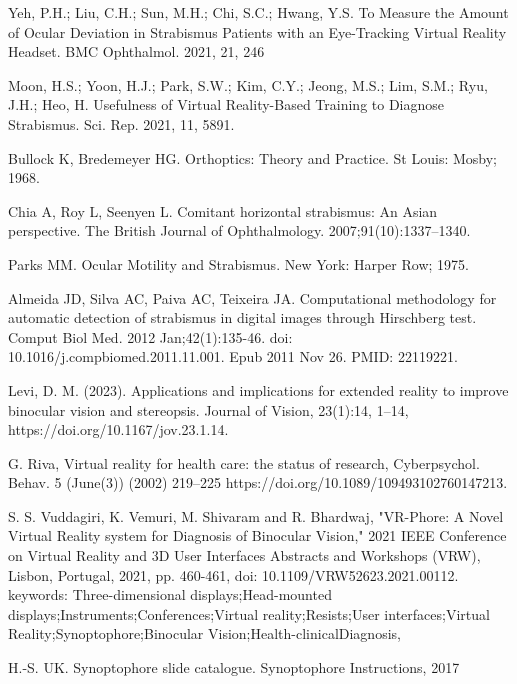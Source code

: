 \documentclass{article}
\begin{document}
\begin{thebibliography}{99}
Yeh, P.H.; Liu, C.H.; Sun, M.H.; Chi, S.C.; Hwang, Y.S. To Measure the Amount of Ocular Deviation in Strabismus Patients with
an Eye-Tracking Virtual Reality Headset. BMC Ophthalmol. 2021, 21, 246

Moon, H.S.; Yoon, H.J.; Park, S.W.; Kim, C.Y.; Jeong, M.S.; Lim, S.M.; Ryu, J.H.; Heo, H. Usefulness of Virtual Reality-Based
Training to Diagnose Strabismus. Sci. Rep. 2021, 11, 5891.


Bullock K, Bredemeyer HG. Orthoptics:
Theory and Practice. St Louis: Mosby;
1968.

Chia A, Roy L, Seenyen L. Comitant
horizontal strabismus: An Asian
perspective. The British Journal of
Ophthalmology. 2007;91(10):1337–1340.

Parks MM. Ocular Motility and Strabismus.
New York: Harper Row; 1975.

Almeida JD, Silva AC, Paiva AC, Teixeira JA. Computational methodology for automatic detection of strabismus in digital images through Hirschberg test. Comput Biol Med. 2012 Jan;42(1):135-46. doi: 10.1016/j.compbiomed.2011.11.001. Epub 2011 Nov 26. PMID: 22119221.

Levi, D. M. (2023). Applications and implications for extended reality to improve binocular vision and stereopsis. Journal of Vision, 23(1):14, 1–14, https://doi.org/10.1167/jov.23.1.14.

G. Riva, Virtual reality for health care: the status of research, Cyberpsychol. Behav. 5 (June(3)) (2002) 219–225 https://doi.org/10.1089/109493102760147213.

S. S. Vuddagiri, K. Vemuri, M. Shivaram and R. Bhardwaj, "VR-Phore: A Novel Virtual Reality system for Diagnosis of Binocular Vision," 2021 IEEE Conference on Virtual Reality and 3D User Interfaces Abstracts and Workshops (VRW), Lisbon, Portugal, 2021, pp. 460-461, doi: 10.1109/VRW52623.2021.00112. keywords: {Three-dimensional displays;Head-mounted displays;Instruments;Conferences;Virtual reality;Resists;User interfaces;Virtual Reality;Synoptophore;Binocular Vision;Health-clinicalDiagnosis},

H.-S. UK. Synoptophore slide catalogue. Synoptophore Instructions,
2017


\end{thebibliography}
\end{document}
